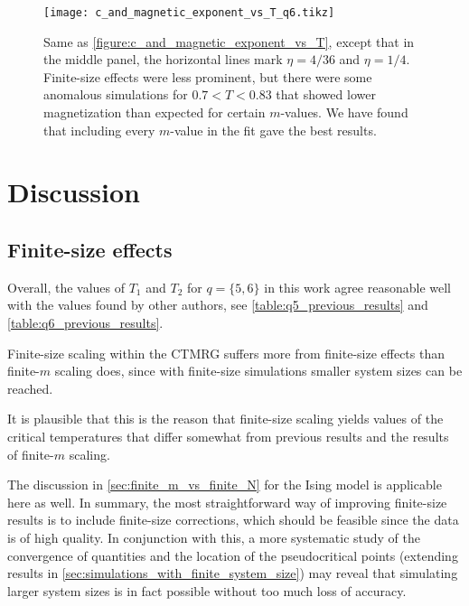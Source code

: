 \begin{figure}
  \centering
  \texttt{[image: c\_and\_magnetic\_exponent\_vs\_T\_q6.tikz]}
  \caption{Same as \autoref{figure:c_and_magnetic_exponent_vs_T}, except that in the middle panel,
  the horizontal lines mark $\eta = 4/36$ and $\eta = 1/4$.
  Finite-size effects were less prominent, but there were some anomalous simulations for $0.7 < T < 0.83$ that showed
  lower magnetization than expected for certain $m$-values.
  We have found that including every $m$-value in the fit gave the best results.
}\label{figure:c_and_magnetic_exponent_vs_T_q6}
\end{figure}


\section{Discussion}

\subsection{Finite-size effects}

Overall, the values of $T_1$ and $T_2$ for $q = \{ 5, 6 \}$ in this work agree reasonable well with the values found by
other authors, see \autoref{table:q5_previous_results} and \autoref{table:q6_previous_results}.

Finite-size scaling within the CTMRG suffers more from finite-size effects than finite-$m$ scaling does,
since with finite-size simulations smaller system sizes can be reached.

It is plausible that this is the reason that finite-size scaling yields values of the critical temperatures that differ
somewhat from previous results and the results of finite-$m$ scaling.

The discussion in \autoref{sec:finite_m_vs_finite_N} for the Ising model is applicable here as well. In summary,
the most straightforward way of improving finite-size results is to include finite-size corrections,
which should be feasible since the data is of high quality.
In conjunction with this, a more systematic study of the convergence of quantities and the location of the
pseudocritical points (extending results in \autoref{sec:simulations_with_finite_system_size}) may reveal that
simulating larger system sizes is in fact possible without too much loss of accuracy.

